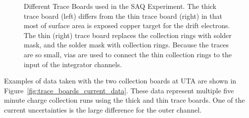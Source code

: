 \begin{figure}[]
\begin{subfigure}{.45\textwidth}
  \caption{}
\end{subfigure}
\caption{Different Trace Boards used in the SAQ Experiment.
The thick trace board (left) differs from the thin trace board (right) in that most of surface area is exposed copper target for the drift electrons.
The thin (right) trace board replaces the collection rings with solder mask, and the solder mask with collection rings.
Because the traces are so small, vias are used to connect the thin collection rings to the input of the integrator channels.
}
\label{fig:trace_boards}
\end{figure}

Examples of data taken with the two collection boards at UTA are shown in Figure~\ref{fig:trace_boards_current_data}.
These data represent multiple five minute charge collection runs using the thick and thin trace boards.
One of the current uncertainties is the large difference for the outer channel.

